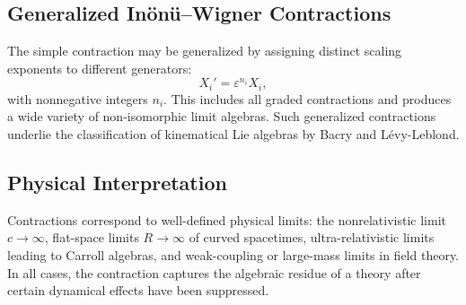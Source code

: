 \subsection{Generalized In\"on\"u--Wigner Contractions}

The simple contraction may be generalized by assigning distinct scaling
exponents to different generators:
\begin{equation}
    X_i' = \varepsilon^{n_i} X_i ,
\end{equation}
with nonnegative integers $n_i$.  This includes all graded contractions and
produces a wide variety of non-isomorphic limit algebras.  Such generalized
contractions underlie the classification of kinematical Lie algebras by Bacry
and L\'evy-Leblond.

\subsection{Physical Interpretation}

Contractions correspond to well-defined physical limits: the
nonrelativistic limit $c\to\infty$, flat-space limits $R\to\infty$ of curved
spacetimes, ultra-relativistic limits leading to Carroll algebras, and
weak-coupling or large-mass limits in field theory.  In all cases, the
contraction captures the algebraic residue of a theory after certain dynamical
effects have been suppressed.



